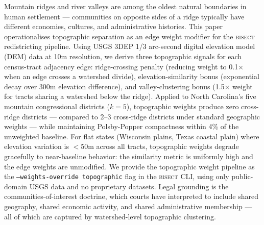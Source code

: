 Mountain ridges and river valleys are among the oldest natural boundaries in human settlement — communities on opposite sides of a ridge typically have different economies, cultures, and administrative histories. This paper operationalises topographic separation as an edge weight modifier for the \textsc{bisect} redistricting pipeline. Using USGS 3DEP 1/3 arc-second digital elevation model (DEM) data at 10m resolution, we derive three topographic signals for each census-tract adjacency edge: ridge-crossing penalty (reducing weight to 0.1$\times$ when an edge crosses a watershed divide), elevation-similarity bonus (exponential decay over 300m elevation difference), and valley-clustering bonus (1.5$\times$ weight for tracts sharing a watershed below the ridge). Applied to North Carolina's five mountain congressional districts ($k=5$), topographic weights produce zero cross-ridge districts — compared to 2--3 cross-ridge districts under standard geographic weights — while maintaining Polsby-Popper compactness within 4\% of the unweighted baseline. For flat states (Wisconsin plains, Texas coastal plain) where elevation variation is $<50$m across all tracts, topographic weights degrade gracefully to near-baseline behavior: the similarity metric is uniformly high and the edge weights are unmodified. We provide the topographic weight pipeline as the \texttt{--weights-override topographic} flag in the \textsc{bisect} CLI, using only public-domain USGS data and no proprietary datasets. Legal grounding is the communities-of-interest doctrine, which courts have interpreted to include shared geography, shared economic activity, and shared administrative membership — all of which are captured by watershed-level topographic clustering.
